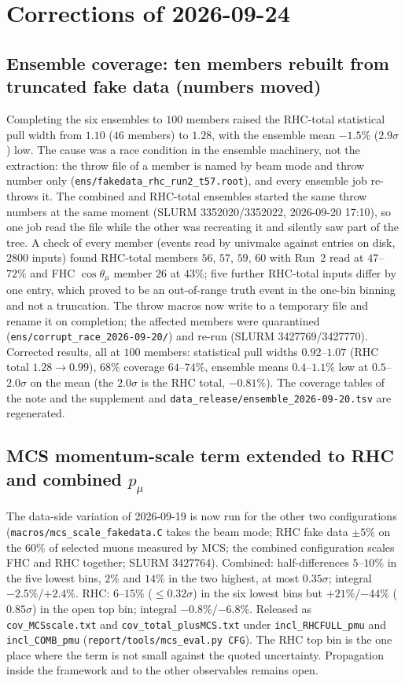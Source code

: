 \section{Corrections of 2026-09-24}

\subsection{Ensemble coverage: ten members rebuilt from truncated fake data (numbers moved)}
Completing the six ensembles to $100$ members raised the RHC-total statistical pull width from
$1.10$ ($46$ members) to $1.28$, with the ensemble mean $-1.5\%$ ($2.9\sigma$) low. The cause was
a race condition in the ensemble machinery, not the extraction: the throw file of a member is
named by beam mode and throw number only (\texttt{ens/fakedata\_rhc\_run2\_t57.root}), and every
ensemble job re-throws it. The combined and RHC-total ensembles started the same throw numbers
at the same moment (SLURM 3352020/3352022, 2026-09-20 17:10), so one job read the file while the
other was recreating it and silently saw part of the tree. A check of every member (events read by
univmake against entries on disk, $2800$ inputs) found RHC-total members $56$, $57$, $59$, $60$ with
Run~2 read at $47$--$72\%$ and FHC $\cos\theta_\mu$ member $26$ at $43\%$; five further RHC-total
inputs differ by one entry, which proved to be an out-of-range truth event in the one-bin
binning and not a truncation. The throw macros now write to a temporary file and rename it on
completion; the affected members were quarantined (\texttt{ens/corrupt\_race\_2026-09-20/}) and
re-run (SLURM 3427769/3427770). Corrected results, all at $100$ members: statistical pull widths
$0.92$--$1.07$ (RHC total $1.28\to0.99$), $68\%$ coverage $64$--$74\%$, ensemble means $0.4$--$1.1\%$
low at $0.5$--$2.0\sigma$ on the mean (the $2.0\sigma$ is the RHC total, $-0.81\%$). The coverage
tables of the note and the supplement and \texttt{data\_release/ensemble\_2026-09-20.tsv} are
regenerated.

\subsection{MCS momentum-scale term extended to RHC and combined $p_\mu$}
The data-side variation of 2026-09-19 is now run for the other two configurations
(\texttt{macros/mcs\_scale\_fakedata.C} takes the beam mode; RHC fake data $\pm5\%$ on the $60\%$ of
selected muons measured by MCS; the combined configuration scales FHC and RHC together; SLURM
3427764). Combined: half-differences $5$--$10\%$ in the five lowest bins, $2\%$ and $14\%$ in the two
highest, at most $0.35\sigma$; integral $-2.5\%$/$+2.4\%$. RHC: $6$--$15\%$ ($\le0.32\sigma$) in
the six lowest bins but $+21\%$/$-44\%$ ($0.85\sigma$) in the open top bin; integral
$-0.8\%$/$-6.8\%$. Released as \texttt{cov\_MCSscale.txt} and \texttt{cov\_total\_plusMCS.txt}
under \texttt{incl\_RHCFULL\_pmu} and \texttt{incl\_COMB\_pmu} (\texttt{report/tools/mcs\_eval.py CFG}).
The RHC top bin is the one place where the term is not small against the quoted uncertainty.
Propagation inside the framework and to the other observables remains open.

